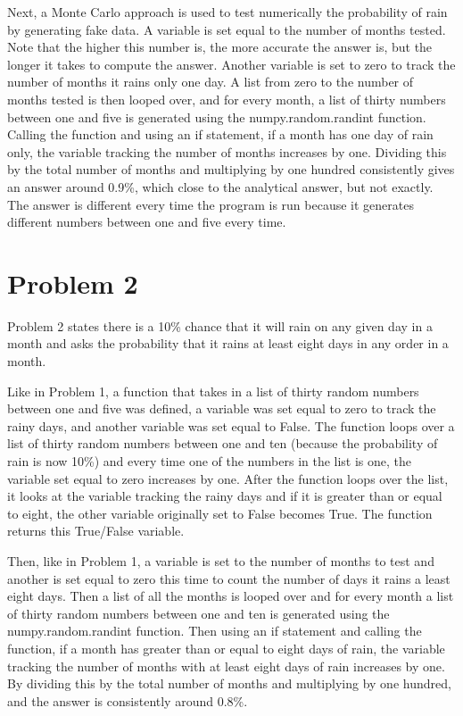 \documentclass[twocolumn]{revtex4}
\begin{document}
	Next, a Monte Carlo approach is used to test numerically the probability of rain by 
	generating fake data. A variable is set equal to the number of months tested. Note that
	the higher this
	number is, the more accurate the answer is, but the longer it takes to compute the 
	answer. Another variable is set to zero to track the number of months it rains only one 
	day. A list from zero to the number of months tested is then looped over, and for every 
	month, a list of thirty 	numbers between one and five is generated using the 
	numpy.random.randint function. Calling the function and using an if 
	statement, if a month has one day of rain only, the variable tracking the number 
	of months increases by one. Dividing this by the total number of months and multiplying
	 by one hundred consistently gives an answer around 0.9\%, which close to the 
	analytical answer, but not exactly. The answer is different every time the program is run 
	because it generates different numbers between one and five every time.

\section{Problem 2}

	Problem 2 states there is a 10\% chance that it will rain on any given day in a month
	 and asks the probability that it rains at least eight days in any order in a month.
	 
	Like in Problem 1, a function that takes in a list of thirty random numbers between one 
	and five was defined, a variable was set equal to zero to track the rainy days, and
	another variable was set equal to False. The function loops over a list of thirty random 
	numbers between one and ten (because the probability of rain is now 10\%) and every
	time one of the numbers in the list is one, the variable set equal to zero increases by
	 one. After the function loops over the list, it looks at the  
	variable tracking the rainy days and if it is greater than or equal to eight, the other 
	variable originally set to False becomes True. The function returns this True/False
	variable.
	
	Then, like in Problem 1, a variable is set to the number of months to test and another 
	is set equal to zero this time to count the number of days it rains a least eight days.
	Then a list of all the months is looped over and for every month a list of thirty random 
	numbers between one and ten is generated using the numpy.random.randint function. 
	Then using an if statement and calling the function, if a month has greater than or equal 
	to eight days of rain, the variable tracking the number of months with at least eight days
	of rain increases by one. By dividing this by the total number of months and multiplying
	 by one hundred, and the answer is consistently around 0.8\%.
\end{document}
